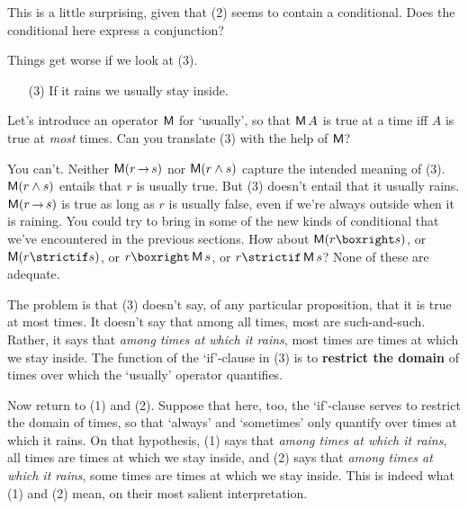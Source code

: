This is a little surprising, given that (2) seems to contain a conditional. Does
the conditional here express a conjunction?

Things get worse if we look at (3).
\begin{enumerate}[leftmargin=10mm]
  \item[(3)] If it rains we usually stay inside.
\end{enumerate}
Let's introduce an operator $\operatorname{\mathsf{M}}$ for `usually', so that $\operatorname{\mathsf{M}} A$ is true
at a time iff $A$ is true at \emph{most} times. Can you translate (3)
with the help of $\operatorname{\mathsf{M}}$?

You can't. Neither $\Mostly(r \to s)$ nor $\operatorname{\mathsf{M}}(r \land s)$ capture the
intended meaning of (3). $\operatorname{\mathsf{M}}(r \land s)$ entails that $r$ is usually true.
But (3) doesn't entail that it usually rains. $\Mostly(r \to s)$ is true as long
as $r$ is usually false, even if we're always outside when it is raining.
You could try to bring in some of the new kinds of conditional that we've
encountered in the previous sections. How about $\Mostly(r \boxright s)$, or
$\Mostly(r \strictif s)$, or $r \boxright \Mostly s$, or
$r \strictif \Mostly s$? None of these are adequate.

The problem is that (3) doesn't say, of any particular proposition, that it is
true at most times. It doesn't say that among all times, most are such-and-such.
Rather, it says that \emph{among times at which it rains}, most times are times
at which we stay inside. The function of the `if'-clause in (3) is to
\textbf{restrict the domain} of times over which the `usually' operator
quantifies.



Now return to (1) and (2). Suppose that here, too, the `if'-clause serves to
restrict the domain of times, so that `always' and `sometimes' only quantify
over times at which it rains. On that hypothesis, (1) says that \emph{among
  times at which it rains}, all times are times at which we stay inside, and (2)
says that \emph{among times at which it rains}, some times are times at which we
stay inside. This is indeed what (1) and (2) mean, on their most salient
interpretation.

